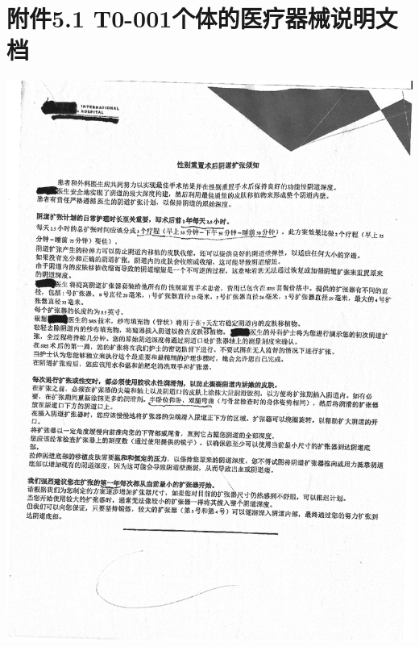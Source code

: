 \documentclass[]{ctexrep}
\begin{document}
	\section*{附件5.1 T0-001个体的医疗器械说明文档}
	\label{附件5.1}
	\includegraphics[scale=0.4]{./附件5.1.1.png}
	
\end{document}
